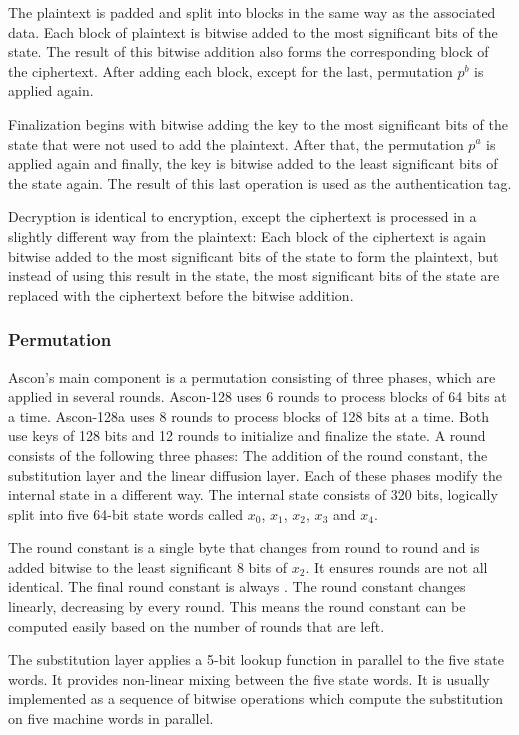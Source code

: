 The plaintext is padded and split into blocks in the same way as the associated
data. Each block of plaintext is bitwise added to the most significant bits of
the state. The result of this bitwise addition also forms the corresponding
block of the ciphertext. After adding each block, except for the last,
permutation $p^b$ is applied again.

Finalization begins with bitwise adding the key to the most significant bits of
the state that were not used to add the plaintext. After that, the permutation
$p^a$ is applied again and finally, the key is bitwise added to the least
significant bits of the state again. The result of this last operation is used
as the authentication tag.

Decryption is identical to encryption, except the ciphertext is processed in a
slightly different way from the plaintext: Each block of the ciphertext is again
bitwise added to the most significant bits of the state to form the plaintext,
but instead of using this result in the state, the most significant bits of the
state are replaced with the ciphertext before the bitwise addition.

\subsubsection{Permutation}

Ascon's main component is a permutation consisting of three phases, which are
applied in several rounds. Ascon-128 uses 6 rounds to process blocks of 64 bits
at a time. Ascon-128a uses 8 rounds to process blocks of 128 bits at a time.
Both use keys of 128 bits and 12 rounds to initialize and finalize the state. A
round consists of the following three phases: The addition of the round
constant, the substitution layer and the linear diffusion layer. Each of these
phases modify the internal state in a different way. The internal state consists
of 320 bits, logically split into five 64-bit state words called $x_0$, $x_1$,
$x_2$, $x_3$ and $x_4$.

The round constant is a single byte that changes from round to round and is
added bitwise to the least significant 8 bits of $x_2$. It ensures rounds are
not all identical. The final round constant is always . The round
constant changes linearly, decreasing by  every round. This means
the round constant can be computed easily based on the number of rounds that are
left.

The substitution layer applies a 5-bit lookup function in parallel to the five
state words. It provides non-linear mixing between the five state words. It is
usually implemented as a sequence of bitwise operations which compute the
substitution on five machine words in parallel.

